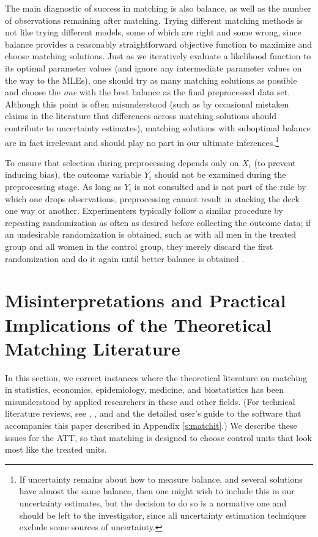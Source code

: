 \documentclass[11pt,titlepage]{article}
\begin{document}
The main diagnostic of success in matching is also balance, as well as
the number of observations remaining after matching.  Trying different
matching methods is not like trying different models, some of which
are right and some wrong, since balance provides a reasonably
straightforward objective function to maximize and choose matching
solutions.  Just as we iteratively evaluate a likelihood function to
its optimal parameter values (and ignore any intermediate parameter
values on the way to the MLEs), one should try as many matching
solutions as possible and choose the \emph{one} with the best balance
as the final preprocessed data set.  Although this point is often
misunderstood (such as by occasional mistaken claims in the literature
that differences across matching solutions should contribute to
uncertainty estimates), matching solutions with suboptimal balance are
in fact irrelevant and should play no part in our ultimate
inferences.\footnote{If uncertainty remains about how to measure
  balance, and several solutions have almost the same balance, then
  one might wish to include this in our uncertainty estimates, but the
  decision to do so is a normative one and should be left to the
  investigator, since all uncertainty estimation techniques exclude
  some sources of uncertainty.}

To ensure that selection during preprocessing depends only on $X_i$
(to prevent inducing bias), the outcome variable $Y_i$ should not be
examined during the preprocessing stage.  As long as $Y_i$ is not
consulted and is not part of the rule by which one drops observations,
preprocessing cannot result in stacking the deck one way or another.
Experimenters typically follow a similar procedure by repeating
randomization as often as desired before collecting the outcome data;
if an undesirable randomization is obtained, such as with all men in
the treated group and all women in the control group, they merely
discard the first randomization and do it again until better balance
is obtained \citep[see][]{Rubin01}.

\section{Misinterpretations and Practical Implications of the 
  Theoretical Matching Literature}\label{s:choose}

In this section, we correct instances where the theoretical literature
on matching in statistics, economics, epidemiology, medicine, and
biostatistics has been misunderstood by applied researchers in these
and other fields.  (For technical literature reviews, see
\citet{Imbens04}, \citet{Rosenbaum02}, and \citet{Stuart04} and the
detailed user's guide to the software that accompanies this paper
described in Appendix \ref{s:matchit}.)  We describe these issues for
the ATT, so that matching is designed to choose control units that
look most like the treated units.
\end{document}

